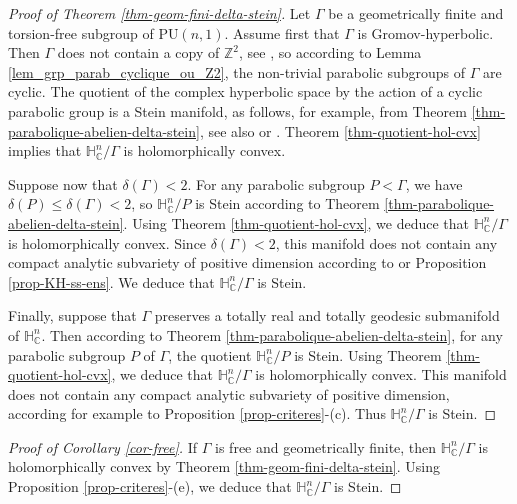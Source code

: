 \documentclass{article}
\theoremstyle{definition}
\theoremstyle{remark}
\newcommand{\C}{\mathbb{C}}
\newcommand{\Z}{\mathbb{Z}}
\newcommand{\HNC}{\mathbb{H}^{n}_{\C}}
\newcommand{\PU}{\mathrm{PU}}
\begin{document}
	\begin{proof}[Proof of Theorem \ref{thm-geom-fini-delta-stein}]
		Let $\Gamma$ be a geometrically finite and torsion-free subgroup of $\PU(n,1)$. Assume first that $\Gamma$ is Gromov-hyperbolic. Then $\Gamma$ does not contain a copy of $\Z^{2}$, see \cite[Corollary III.$\Gamma$.3.10]{bridsonMetricSpacesNonpositive1999}, so according to Lemma \ref{lem_grp_parab_cyclique_ou_Z2}, the non-trivial parabolic subgroups of $\Gamma$ are cyclic. The quotient of the complex hyperbolic space by the action of a cyclic parabolic group is a Stein manifold, as follows, for example, from Theorem \ref{thm-parabolique-abelien-delta-stein}, see also \cite{defabritiisQuotientsUnitBall2001manuel} or \cite{miebachQuotientsBoundedHomogeneous2010}. Theorem \ref{thm-quotient-hol-cvx} implies that $\HNC/\Gamma$ is holomorphically convex.
		
		Suppose now that $\delta(\Gamma)<2$. For any parabolic subgroup $P<\Gamma$, we have $\delta(P)\le \delta(\Gamma)<2$, so $\HNC/P$ is Stein according to Theorem \ref{thm-parabolique-abelien-delta-stein}. Using Theorem \ref{thm-quotient-hol-cvx}, we deduce that $\HNC/\Gamma$ is holomorphically convex. Since $\delta(\Gamma)<2$, this manifold does not contain any compact analytic subvariety of positive dimension according to \cite[Theorem 15]{deyNoteComplexhyperbolicKleinian2020} or Proposition \ref{prop-KH-ss-ens}. We deduce that $\HNC/\Gamma$ is Stein.
		
		Finally, suppose that $\Gamma$ preserves a totally real and totally geodesic submanifold of $\HNC$. Then according to Theorem \ref{thm-parabolique-abelien-delta-stein}, for any parabolic subgroup $P$ of $\Gamma$, the quotient $\HNC/P$ is Stein. Using Theorem \ref{thm-quotient-hol-cvx}, we deduce that $\HNC/\Gamma$ is holomorphically convex. This manifold does not contain any compact analytic subvariety of positive dimension, according for example to Proposition \ref{prop-criteres}-(c). Thus $\HNC/\Gamma$ is Stein.
	\end{proof}

\begin{proof}[Proof of Corollary \ref{cor-free}]
	If $\Gamma$ is free and geometrically finite, then $\HNC/\Gamma$ is holomorphically convex by Theorem \ref{thm-geom-fini-delta-stein}. Using Proposition \ref{prop-criteres}-(e), we deduce that $\HNC/\Gamma$ is Stein.
\end{proof}
\end{document}
